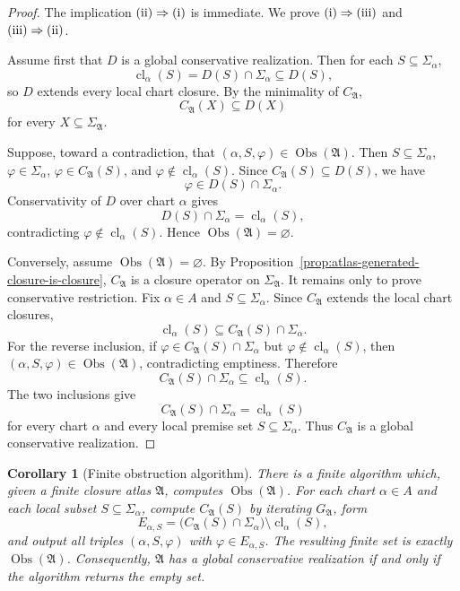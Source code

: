 \documentclass[11pt]{amsart}
\numberwithin{equation}{section}
\theoremstyle{plain}
\newtheorem{corollary}[theorem]{Corollary}
\theoremstyle{definition}
\theoremstyle{remark}
\newcommand{\Cl}{\operatorname{cl}}
\newcommand{\A}{\mathfrak A}
\newcommand{\Sig}{\Sigma}
\newcommand{\Obs}{\operatorname{Obs}}
\newcommand{\CA}{C_{\mathfrak A}}
\newcommand{\GA}{G_{\mathfrak A}}
\begin{document}
\begin{proof}
The implication \(\textup{(ii)}\Rightarrow\textup{(i)}\) is immediate.  We prove \(\textup{(i)}\Rightarrow\textup{(iii)}\) and \(\textup{(iii)}\Rightarrow\textup{(ii)}\).

Assume first that \(D\) is a global conservative realization.  Then for each \(S\subseteq\Sig_\alpha\),
\[
  \Cl_\alpha(S)=D(S)\cap\Sig_\alpha\subseteq D(S),
\]
so \(D\) extends every local chart closure.  By the minimality of \(\CA\),
\[
  \CA(X)\subseteq D(X)
\]
for every \(X\subseteq\Sig_{\A}\).

Suppose, toward a contradiction, that \((\alpha,S,\varphi)\in\Obs(\A)\).  Then \(S\subseteq\Sig_\alpha\), \(\varphi\in\Sig_\alpha\), \(\varphi\in\CA(S)\), and \(\varphi\notin\Cl_\alpha(S)\).  Since \(\CA(S)\subseteq D(S)\), we have
\[
  \varphi\in D(S)\cap\Sig_\alpha.
\]
Conservativity of \(D\) over chart \(\alpha\) gives
\[
  D(S)\cap\Sig_\alpha=\Cl_\alpha(S),
\]
contradicting \(\varphi\notin\Cl_\alpha(S)\).  Hence \(\Obs(\A)=\varnothing\).

Conversely, assume \(\Obs(\A)=\varnothing\).  By Proposition~\ref{prop:atlas-generated-closure-is-closure}, \(\CA\) is a closure operator on \(\Sig_{\A}\).  It remains only to prove conservative restriction.  Fix \(\alpha\in A\) and \(S\subseteq\Sig_\alpha\).  Since \(\CA\) extends the local chart closures,
\[
  \Cl_\alpha(S)\subseteq \CA(S)\cap\Sig_\alpha.
\]
For the reverse inclusion, if \(\varphi\in\CA(S)\cap\Sig_\alpha\) but \(\varphi\notin\Cl_\alpha(S)\), then \((\alpha,S,\varphi)\in\Obs(\A)\), contradicting emptiness.  Therefore
\[
  \CA(S)\cap\Sig_\alpha\subseteq\Cl_\alpha(S).
\]
The two inclusions give
\[
  \CA(S)\cap\Sig_\alpha=\Cl_\alpha(S)
\]
for every chart \(\alpha\) and every local premise set \(S\subseteq\Sig_\alpha\).  Thus \(\CA\) is a global conservative realization.
\end{proof}

\begin{corollary}[Finite obstruction algorithm]
\label{cor:finite-obstruction-algorithm}
There is a finite algorithm which, given a finite closure atlas \(\A\), computes \(\Obs(\A)\).  For each chart \(\alpha\in A\) and each local subset \(S\subseteq\Sig_\alpha\), compute \(\CA(S)\) by iterating \(\GA\), form
\[
  E_{\alpha,S}
  =
  \bigl(\CA(S)\cap\Sig_\alpha\bigr)\setminus\Cl_\alpha(S),
\]
and output all triples \((\alpha,S,\varphi)\) with \(\varphi\in E_{\alpha,S}\).  The resulting finite set is exactly \(\Obs(\A)\).  Consequently, \(\A\) has a global conservative realization if and only if the algorithm returns the empty set.
\end{corollary}
\end{document}
